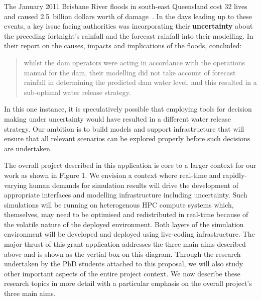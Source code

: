The January 2011 Brisbane River floods in south-east Queensland cost
32 lives and caused 2.5~billion dollars worth of
damage~\parencite{vandenhonert2011}. In the days leading up to these
events, a key issue facing authorities was incorporating their
\textbf{uncertainty} about the preceding fortnight's rainfall and the
forecast rainfall into their modelling. In their report on the causes,
impacts and implications of the floods, \cite{vandenhonert2011}
concluded:
\blockquote{whilst the dam operators were acting in accordance with
  the operations manual for the dam, their modelling did not take
  account of forecast rainfall in determining the predicted dam water
  level, and this resulted in a sub-optimal water release strategy.
  } 
In this one instance, it is speculatively possible that employing tools 
for decision making under uncertainty would have
resulted in a different water release strategy. Our ambition is to build models 
and support infrastructure that will ensure that all relevant scenarios
can be explored properly before such decisions are undertaken.

The overall project described in this application is core to a larger context for our work as 
 shown in Figure 1. We envision a context where real-time and rapidly-varying human demands for 
 simulation results will drive the development of appropriate interfaces and modelling infrastructure including uncertainty. 
 Such simulations will be running on heterogenous HPC compute systems which, themselves, may need to be optimised and redistributed in real-time because of the volatile nature of the deployed environment. Both layers of the simulation environment will be developed and deployed using live-coding infrastructure. The major thrust of this grant application addresses the three main aims described above
 and is shown as the vertial box on this diagram. Through the research undertaken by the PhD students attached to this proposal, we will also study other important aspects of the entire project context. 
 We now describe these research topics in more detail with a particular emphasis on the overall project's  three main aims.
 
